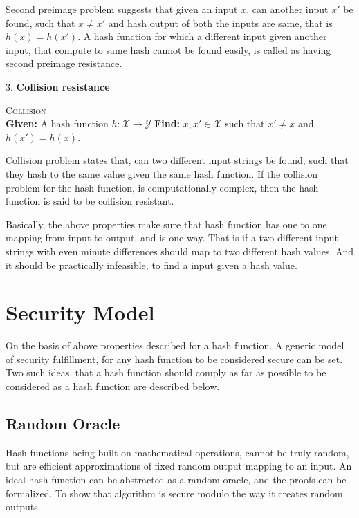 Second preimage problem suggests that given an input $x$, can another input $x'$ be found, such that
$ x \neq x'$ and hash output of both the inputs are same, that is $h(x) = h(x')$. A hash function for
which a different input given another input, that compute to same hash cannot be found easily, is 
called as having second preimage resistance.

3. {\bf Collision resistance}
\begin{center}
  \framebox
  {
    \parbox{350pt}
    {
      \centering \textsc{Collision} \\
      {\bf Given:} A hash function $h : \mathcal{X} \to \mathcal{Y}$ 
      {\bf Find:} $x, x' \in \mathcal{X}$ such that $x' \neq x$ and $h(x') = h(x)$. 
    }
  }
\end{center}
\vspace{4mm}

Collision problem states that, can two different input strings be found, such that they hash to the
same value given the same hash function. If the collision problem for the hash function, is computationally
complex, then the hash function is said to be collision resistant.

Basically, the above properties make sure that hash function has one to one mapping from input to
output, and is one way. That is if a two different input strings with even minute differences should
map to two different hash values. And it should be practically infeasible, to find a input given a
hash value. \\

\section{Security Model}

On the basis of above properties described for a hash function. A generic model of security fulfillment, 
for any hash function to be considered secure can be set. Two such ideas, that a hash function should
comply as far as possible to be considered as a hash function are described below.

  \subsection{ Random Oracle }
  Hash functions being built on mathematical operations, cannot be truly random, but are efficient
  approximations of fixed random output mapping to an input. An ideal hash function can be abstracted 
  as a random oracle, and the proofs can be formalized. To show that algorithm is secure modulo the way
  it creates random outputs. \cite{00018}

